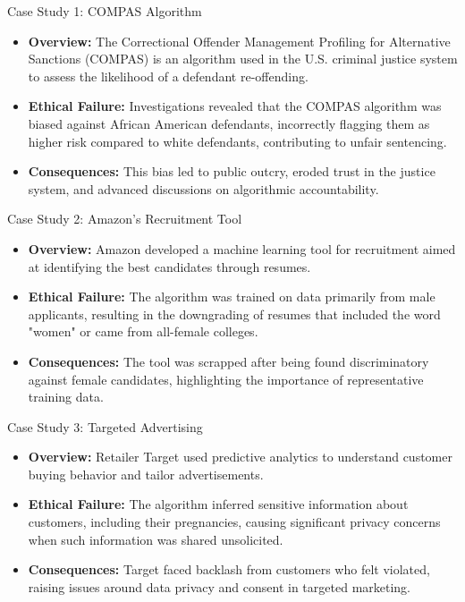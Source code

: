 \documentclass[aspectratio=169]{beamer}
\begin{document}
\begin{frame}[fragile]{Case Study 1: COMPAS Algorithm}
    \begin{itemize}
        \item \textbf{Overview:} 
            The Correctional Offender Management Profiling for Alternative Sanctions (COMPAS) is an algorithm used in the U.S. criminal justice system to assess the likelihood of a defendant re-offending.
        
        \item \textbf{Ethical Failure:} 
            Investigations revealed that the COMPAS algorithm was biased against African American defendants, incorrectly flagging them as higher risk compared to white defendants, contributing to unfair sentencing.
        
        \item \textbf{Consequences:} 
            This bias led to public outcry, eroded trust in the justice system, and advanced discussions on algorithmic accountability.
    \end{itemize}
\end{frame}

\begin{frame}[fragile]{Case Study 2: Amazon's Recruitment Tool}
    \begin{itemize}
        \item \textbf{Overview:} 
            Amazon developed a machine learning tool for recruitment aimed at identifying the best candidates through resumes.
        
        \item \textbf{Ethical Failure:} 
            The algorithm was trained on data primarily from male applicants, resulting in the downgrading of resumes that included the word "women" or came from all-female colleges.
        
        \item \textbf{Consequences:} 
            The tool was scrapped after being found discriminatory against female candidates, highlighting the importance of representative training data.
    \end{itemize}
\end{frame}

\begin{frame}[fragile]{Case Study 3: Targeted Advertising}
    \begin{itemize}
        \item \textbf{Overview:} 
            Retailer Target used predictive analytics to understand customer buying behavior and tailor advertisements.
        
        \item \textbf{Ethical Failure:} 
            The algorithm inferred sensitive information about customers, including their pregnancies, causing significant privacy concerns when such information was shared unsolicited.
        
        \item \textbf{Consequences:} 
            Target faced backlash from customers who felt violated, raising issues around data privacy and consent in targeted marketing.
    \end{itemize}
\end{frame}
\end{document}
